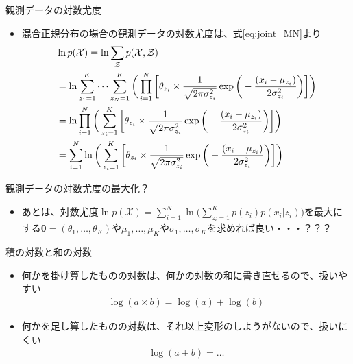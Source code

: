 \documentclass[aspectratio=169,unicode,dvipdfmx,14pt]{beamer}
\begin{document}
\begin{frame}{観測データの対数尤度}
\begin{itemize}
\item 混合正規分布の場合の観測データの対数尤度は、式\eqref{eq:joint_MN}より
\vspace{-.1in}
\begin{align}
& \ln p(\mathcal{X}) = \ln \sum_{\mathcal{Z}} p(\mathcal{X}, \mathcal{Z})
\notag \\ &
= \ln \sum_{z_1=1}^K \cdots \sum_{z_N=1}^K \bigg( \prod_{i=1}^N \bigg[ \theta_{z_i} \times \frac{1}{\sqrt{2\pi\sigma_{z_i}^2}}\exp\bigg( - \frac{(x_i - \mu_{z_i})}{2\sigma_{z_i}^2} \bigg) \bigg] \bigg)
\notag \\ &
= \ln \prod_{i=1}^N \bigg( \sum_{z_i=1}^K \bigg[ \theta_{z_i} \times \frac{1}{\sqrt{2\pi\sigma_{z_i}^2}}\exp\bigg( - \frac{(x_i - \mu_{z_i})}{2\sigma_{z_i}^2} \bigg) \bigg] \bigg)
\notag \\ &
= \sum_{i=1}^N \ln \bigg( \sum_{z_i=1}^K \bigg[ \theta_{z_i} \times \frac{1}{\sqrt{2\pi\sigma_{z_i}^2}}\exp\bigg( - \frac{(x_i - \mu_{z_i})}{2\sigma_{z_i}^2} \bigg) \bigg] \bigg)
\end{align}
\end{itemize}
\end{frame}

\begin{frame}{観測データの対数尤度の最大化？}
\begin{itemize}
\item あとは、対数尤度$\ln p(\mathcal{X}) = \sum_{i=1}^N \ln \Big( \sum_{z_i=1}^K p(z_i) p(x_i | z_i) \Big)$を最大にする$\bm{\theta}=(\theta_1,\ldots,\theta_K)$や$\mu_1,\ldots,\mu_K$や$\sigma_1,\ldots,\sigma_K$を求めれば良い・・・？？？
\end{itemize}
\end{frame}


\begin{frame}{積の対数と和の対数}
\begin{itemize}
\item 何かを掛け算したものの対数は、何かの対数の和に書き直せるので、扱いやすい
\begin{align}
\log(a \times b) = \log(a) + \log(b)
\end{align}
\item 何かを足し算したものの対数は、それ以上変形のしようがないので、扱いにくい
\begin{align}
\log(a + b) = \ldots
\end{align}\end{itemize}
\end{frame}
\end{document}
